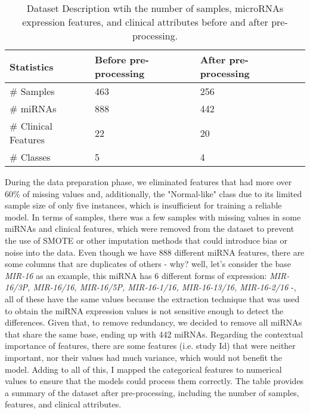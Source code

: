 \begin{table}[h]
  \centering
  \caption{Dataset Description wtih the number of samples, microRNAs expression features, and clinical attributes before and after pre-processing.}

  \begin{tabular}{|l|l|l|l|}
    \hline
    \textbf{Statistics}  & \textbf{Before pre-processing} & \textbf{After pre-processing} \\ \hline
    \# Samples           & 463                            & 256                           \\ \hline
    \# miRNAs            & 888                            & 442 \footnotemark[1]          \\ \hline
    \# Clinical Features & 22                             & 20                            \\ \hline
    \# Classes           & 5                              & 4 \footnotemark[1]            \\ \hline
  \end{tabular}
  \label{tab:dataset_description}
\end{table}


During the data preparation phase, we eliminated features that had more over
60\% of missing values and, additionally, the "Normal-like" class due to its
limited sample size of only five instances, which is insufficient for training
a reliable model. In terms of samples, there was a few samples with missing
values in some miRNAs and clinical features, which were removed from the
dataset to prevent the use of SMOTE or other imputation methods that could
introduce bias or noise into the data. Even though we have 888 different miRNA
features, there are some columns that are duplicates of others - why? well,
let’s consider the base \textit{MIR-16} as an example, this miRNA has 6
different forms of expression: \textit{MIR-16/3P, MIR-16/16, MIR-16/5P,
  MIR-16-1/16, MIR-16-13/16, MIR-16-2/16} -, all of these have the same values
because the extraction technique that was used to obtain the miRNA expression
values is not sensitive enough to detect the differences. Given that, to remove
redundancy, we decided to remove all miRNAs that share the same base, ending up
with 442 miRNAs. Regarding the contextual importance of features, there are
some features (i.e. study Id) that were neither important, nor their values had
much variance, which would not benefit the model. Adding to all of this, I
mapped the categorical features to numerical values to ensure that the models
could process them correctly. The table provides a summary of the dataset after
pre-processing, including the number of samples, features, and clinical
attributes.

